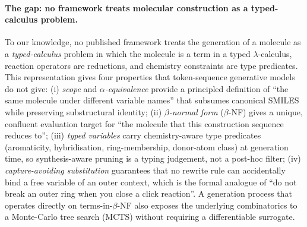 \paragraph{The gap: no framework treats molecular construction as a typed-calculus problem.}
To our knowledge, no published framework treats the generation of a
molecule as a {\em typed-calculus} problem in which the molecule is a
term in a typed $\lambda$-calculus, reaction operators are reductions,
and chemistry constraints are type predicates.
This representation gives four properties that token-sequence
generative models do not give:
(i) {\em scope} and {\em $\alpha$-equivalence} provide a
principled definition of ``the same molecule under different
variable names'' that subsumes canonical SMILES while preserving
substructural identity;
(ii) {\em $\beta$-normal form} ($\beta$-NF) gives a unique, confluent
evaluation target for ``the molecule that this construction sequence
reduces to'';
(iii) {\em typed variables} carry chemistry-aware type predicates
(aromaticity, hybridisation, ring-membership, donor-atom class) at
generation time, so synthesis-aware pruning is a typing judgement,
not a post-hoc filter;
(iv) {\em capture-avoiding substitution} guarantees that no rewrite
rule can accidentally bind a free variable of an outer context, which
is the formal analogue of ``do not break an outer ring when you
close a click reaction''.
A generation process that operates directly on terms-in-$\beta$-NF
also exposes the underlying combinatorics to a Monte-Carlo tree
search (MCTS) without requiring a differentiable surrogate.

